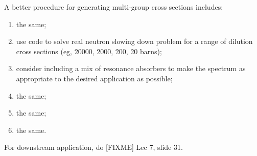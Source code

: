 \documentclass{school-22.211-notes}
\begin{document}
A better procedure for generating multi-group cross sections includes:
\begin{enumerate}
\item the same;
\item use code to solve real neutron slowing down problem for a range of dilution cross sections (eg, 20000, 2000, 200, 20 barns);
\item consider including a mix of resonance absorbers to make the spectrum as appropriate to the desired application as possible;
\item the same;
\item the same;
\item the same.
\end{enumerate}

For downstream application, do [FIXME] Lec 7, slide 31. 
\end{document}
